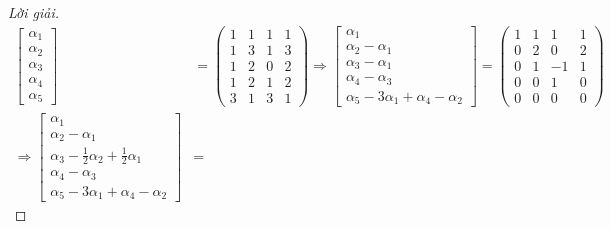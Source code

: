 \documentclass[class=linearalgebra,crop=false]{standalone}
\begin{document}
\begin{proof}[Lời giải]
    \begin{align*}
        \begin{bmatrix}
            \alpha_{1} \\
            \alpha_{2} \\
            \alpha_{3} \\
            \alpha_{4} \\
            \alpha_{5}
        \end{bmatrix}  & =
        \begin{pmatrix}
            1 & 1 & 1 & 1 \\
            1 & 3 & 1 & 3 \\
            1 & 2 & 0 & 2 \\
            1 & 2 & 1 & 2 \\
            3 & 1 & 3 & 1
        \end{pmatrix}
        \Longrightarrow
        \begin{bmatrix}
            \alpha_{1}            \\
            \alpha_{2}-\alpha_{1} \\
            \alpha_{3}-\alpha_{1} \\
            \alpha_{4}-\alpha_{3} \\
            \alpha_{5}-3\alpha_{1}+\alpha_{4}-\alpha_{2}
        \end{bmatrix}=
        \begin{pmatrix}
            1 & 1 & 1  & 1 \\
            0 & 2 & 0  & 2 \\
            0 & 1 & -1 & 1 \\
            0 & 0 & 1  & 0 \\
            0 & 0 & 0  & 0
        \end{pmatrix}     \\
        \Longrightarrow
        \begin{bmatrix}
            \alpha_{1}                                             \\
            \alpha_{2}-\alpha_{1}                                  \\
            \alpha_{3}-\frac{1}{2}\alpha_{2}+\frac{1}{2}\alpha_{1} \\
            \alpha_{4} - \alpha_{3}                                \\
            \alpha_{5} - 3\alpha_{1} + \alpha_{4} - \alpha_{2}
        \end{bmatrix} & =

\end{align*}
\end{proof}
\end{document}
